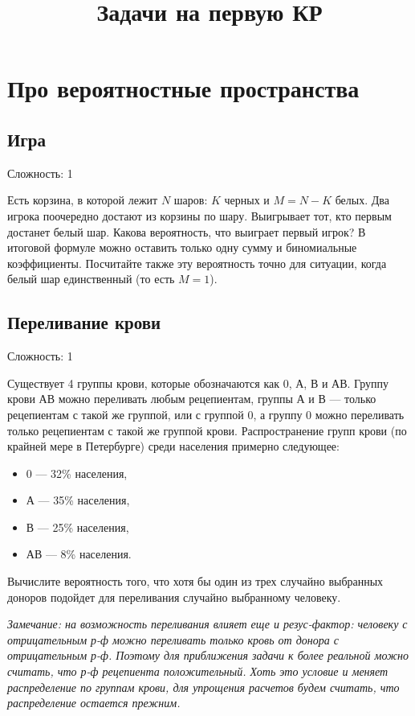 \documentclass[12pt]{article}
\title{Задачи на первую КР}
\begin{document}
\maketitle

\section{Про вероятностные пространства}

\subsection{Игра}

Сложность: 1

Есть корзина, в которой лежит $N$ шаров: $K$ черных и $M = N - K$ белых. Два игрока поочередно достают из корзины по шару. Выигрывает тот, кто первым достанет белый шар. Какова вероятность, что выиграет первый игрок? В итоговой формуле можно оставить только одну сумму и биномиальные коэффициенты. Посчитайте также эту вероятность точно для ситуации, когда белый шар единственный (то есть $M = 1$).

\subsection{Переливание крови}

Сложность: 1

Существует 4 группы крови, которые обозначаются как 0, А, В и АВ. Группу крови АВ можно переливать любым рецепиентам, группы А и В --- только рецепиентам с такой же группой, или с группой 0, а группу 0 можно переливать только рецепиентам с такой же группой крови. Распространение групп крови (по крайней мере в Петербурге) среди населения примерно следующее:
\begin{itemize}
    \item 0 --- 32\% населения,
    \item А --- 35\% населения,
    \item В --- 25\% населения,
    \item АВ --- 8\% населения.
\end{itemize}

Вычислите вероятность того, что хотя бы один из трех случайно выбранных доноров подойдет для переливания случайно выбранному человеку. 

\emph{Замечание: на возможность переливания влияет еще и резус-фактор: человеку с отрицательным р-ф можно переливать только кровь от донора с отрицательным р-ф. Поэтому для приближения задачи к более реальной можно считать, что р-ф рецепиента положительный. Хоть это условие и меняет распределение по группам крови, для упрощения расчетов будем считать, что распределение остается прежним.}
\end{document}
